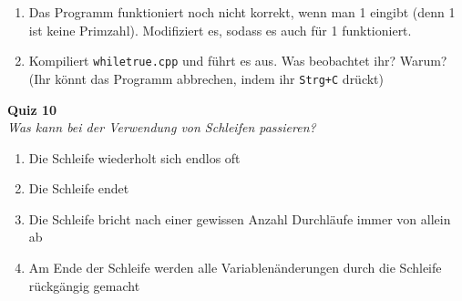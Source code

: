 \begin{spiel}
	\begin{enumerate}
		\item Das Programm funktioniert noch nicht korrekt, wenn man 1 eingibt
		      (denn 1 ist keine Primzahl). Modifiziert es, sodass es auch für 1
		      funktioniert.
		\item Kompiliert \texttt{whiletrue.cpp} und führt es aus. Was beobachtet
		      ihr? Warum? (Ihr könnt das Programm abbrechen, indem ihr
		      \texttt{Strg+C} drückt)
	\end{enumerate}


\end{spiel}

\textbf{Quiz 10}\\
\textit{Was kann bei der Verwendung von Schleifen passieren?}
\begin{enumerate}[label=\alph*)]
	\item Die Schleife wiederholt sich endlos oft
	\item Die Schleife endet
	\item Die Schleife bricht nach einer gewissen Anzahl Durchläufe immer von allein ab
	\item Am Ende der Schleife werden alle Variablenänderungen durch die Schleife rückgängig gemacht
\end{enumerate}
